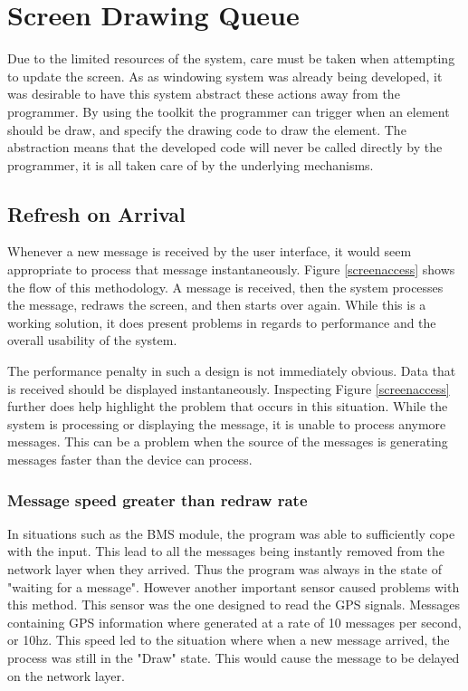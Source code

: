 

\section{Screen Drawing Queue}
\label{sec:screendrawing}

Due to the limited resources of the system, care must be taken when attempting to update the screen. As as windowing system was already being developed, it was desirable to have this system abstract these actions away from the programmer. By using the toolkit the programmer can trigger when an element should be draw, and specify the drawing code to draw the element. The abstraction means that the developed code will never be called directly by the programmer, it is all taken care of by the underlying mechanisms.

\subsection{Refresh on Arrival}

Whenever a new message is received by the user interface, it would seem appropriate to process that message instantaneously. Figure \ref{screenaccess} shows the flow of this methodology. A message is received, then the system processes the message, redraws the screen, and then starts over again. While this is a working solution, it does present problems in regards to performance and the overall usability of the system.


The performance penalty in such a design is not immediately obvious. Data that is received should be displayed instantaneously. Inspecting Figure \ref{screenaccess} further does help highlight the problem that occurs in this situation. While the system is processing or displaying the message, it is unable to process anymore messages. This can be a problem when the source of the messages is generating messages faster than the device can process.

\subsubsection{Message speed greater than redraw rate}

In situations such as the BMS module, the program was able to sufficiently cope with the input. This lead to all the messages being instantly removed from the network layer when they arrived. Thus the program was always in the state of "waiting for a message". However another important sensor caused problems with this method. This sensor was the one designed to read the GPS signals. Messages containing GPS information where generated at a rate of 10 messages per second, or 10hz. This speed led to the situation where when a new message arrived, the process was still in the "Draw" state. This would cause the message to be delayed on the network layer.

